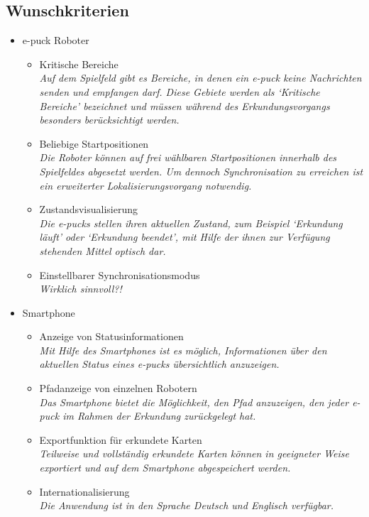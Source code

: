 \documentclass[10pt,a4paper]{article}
\begin{document}
		\subsection{Wunschkriterien}
			\begin{itemize}
				\item e-puck Roboter
				\begin{itemize}
					\item Kritische Bereiche
						\\ \textsl{Auf dem Spielfeld gibt es Bereiche, in denen ein e-puck keine Nachrichten senden
							und empfangen darf. Diese Gebiete werden als `Kritische Bereiche' bezeichnet und müssen
							während des Erkundungsvorgangs besonders berücksichtigt werden.}											
					\item Beliebige Startpositionen
						\\ \textsl{Die Roboter können auf frei wählbaren Startpositionen innerhalb des Spielfeldes
							abgesetzt werden. Um dennoch Synchronisation zu erreichen ist ein erweiterter Lokalisierungsvorgang
							notwendig.}
					\item Zustandsvisualisierung
						\\ \textsl{Die e-pucks stellen ihren aktuellen Zustand, zum Beispiel `Erkundung läuft' oder `Erkundung
							beendet', mit Hilfe der ihnen zur Verfügung stehenden Mittel optisch dar.}												
					\item Einstellbarer Synchronisationsmodus
						\\ \textsl{Wirklich sinnvoll?!}		
				\end{itemize}
				\item Smartphone
				\begin{itemize}
					\item Anzeige von Statusinformationen
						\\ \textsl{Mit Hilfe des Smartphones ist es möglich, Informationen über den aktuellen Status eines e-pucks
							übersichtlich anzuzeigen.}		
					\item Pfadanzeige von einzelnen Robotern
						\\ \textsl{Das Smartphone bietet die Möglichkeit, den Pfad anzuzeigen, den jeder e-puck im Rahmen der
							Erkundung zurückgelegt hat.}							
					\item Exportfunktion für erkundete Karten
						\\ \textsl{Teilweise und vollständig erkundete Karten können in geeigneter Weise exportiert und auf dem
							Smartphone abgespeichert werden.}		
					\item Internationalisierung
						\\ \textsl{Die Anwendung ist in den Sprache Deutsch und Englisch verfügbar.}									
				\end{itemize}
			\end{itemize}
\end{document}
